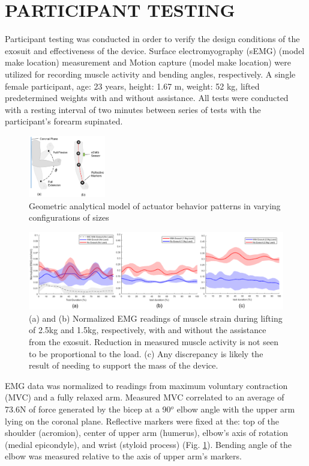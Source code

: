 \documentclass[letterpaper, 10 pt, conference]{ieeeconf}  %
\begin{document}
\section{PARTICIPANT TESTING}

Participant testing was conducted in order to verify the design conditions of the exosuit and effectiveness of the device. Surface electromyography (sEMG) (model make location) measurement and Motion capture (model make location) were utilized for recording muscle activity and bending angles, respectively. A single female participant, age: 23 years, height: 1.67 m, weight: 52 kg, lifted predetermined weights with and without assistance. All tests were conducted with a resting interval of two minutes between series of tests with the participant’s forearm supinated. 

\begin{figure}[b!]
\centering
\includegraphics[width=0.3\textwidth]{sEMG.PNG}
\caption{Geometric analytical model of actuator behavior patterns in varying configurations of sizes}
\label{fig:sEMG}
\end{figure}

\begin{figure}[t]
\centering
\includegraphics[width=\textwidth]{EMG_Stuff.PNG}
\caption{(a) and (b) Normalized EMG readings of muscle strain during lifting of 2.5kg and 1.5kg, respectively, with and without the assistance from the exosuit. Reduction in measured muscle activity is not seen to be proportional to the load.  (c) Any discrepancy is likely the result of needing to support the mass of the device.}
\label{fig:EMG}
\vspace{-1.5em}
\end{figure}
EMG data was normalized to readings from maximum voluntary contraction (MVC) and a fully relaxed arm. Measured MVC correlated to an average of 73.6N of force generated by the bicep at a 90$^o$ elbow angle with the upper arm lying on the coronal plane. Reflective markers were fixed at the: top of the shoulder (acromion), center of upper arm (humerus), elbow’s axis of rotation (medial epicondyle), and wrist (styloid process) (Fig. \ref{fig:sEMG}). Bending angle of the elbow was measured relative to the axis of upper arm’s markers. 
\end{document}
